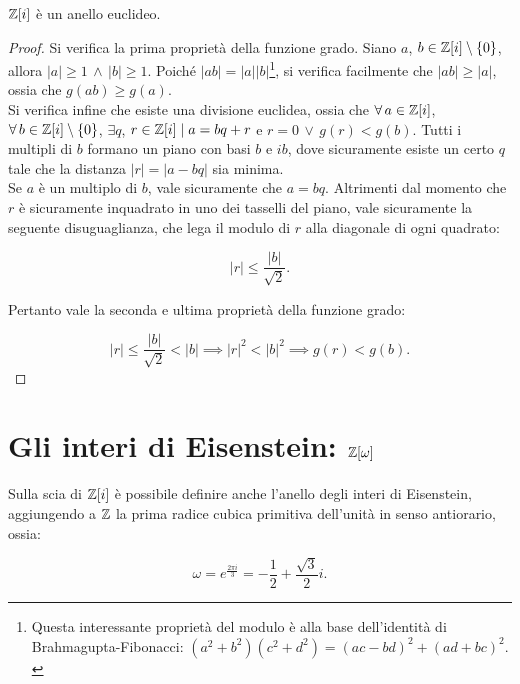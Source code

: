 \documentclass[11pt]{scrbook}
\begin{document}
\begin{theorem}
    $\mathbb Z[i]$ è un anello euclideo.
\end{theorem}

\begin{proof}
    Si verifica la prima proprietà della funzione grado. Siano $a$, $b \in \mathbb Z[i] \setminus \{0\}$,
    allora $\left|a\right| \geq 1 \,\land\, \left|b\right| \geq 1$. Poiché
    $\left|ab\right| = \left|a\right|\left|b\right|$\footnote{Questa interessante proprietà del modulo è alla base dell'identità di Brahmagupta-Fibonacci: $(a^2 + b^2)(c^2 + d^2) = (ac-bd)^2 + (ad+bc)^2.$}, si verifica facilmente che
    $\left|ab\right| \geq \left|a\right|$, ossia che $g(ab) \geq g(a)$. \\

    Si verifica infine che esiste una divisione euclidea, ossia che
    $\forall a \in \ZZ[i]$, $\forall b \in \ZZ[i] \setminus \{0\}$, $\exists q$, $r \in \mathbb Z[i] \mid a = bq + r$ e $r=0 \,\lor\, g(r) < g(b)$.
    Tutti i multipli di $b$ formano un piano con basi $b$ e $ib$, dove
    sicuramente esiste un certo $q$ tale che la distanza $\left|r\right| = \left|a-bq\right|$ sia minima. \\

    Se $a$ è un multiplo di $b$, vale sicuramente che $a = bq$. Altrimenti dal momento che $r$ è sicuramente inquadrato in uno dei tasselli del piano, vale
    sicuramente la seguente disuguaglianza, che lega il modulo di $r$ alla diagonale di
    ogni quadrato:

    \[\left|r\right| \leq \frac{\left|b\right|}{\sqrt{2}}.\]

    Pertanto vale la seconda e ultima proprietà della funzione grado:

    \[\left|r\right| \leq \frac{\left|b\right|}{\sqrt{2}} < \left|b\right| \implies \left|r\right|^2 < \left|b\right|^2 \implies g(r) < g(b).\]
\end{proof}

\section{Gli interi di Eisenstein: \texorpdfstring{$\mathbb Z[\omega]$}{Z[ω]}}

Sulla scia di $\mathbb Z[i]$ è possibile definire anche l'anello degli
interi di Eisenstein, aggiungendo a $\mathbb Z$ la prima radice cubica
primitiva dell'unità in senso antiorario, ossia:

\[\omega = e^{\frac{2\pi i}{3}} = -\frac{1}{2} + \frac{\sqrt{3}}{2}i.\]
\end{document}
